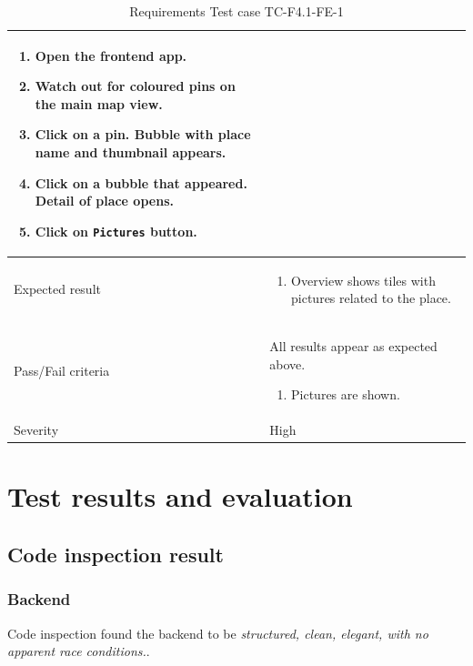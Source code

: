 \documentclass[11pt]{book}
\begin{document}
\begin{table}
\begin{tabular}{| p{3cm} | p{9.5cm} |}
                            \begin{enumerate}
                              \item Open the frontend app.
                              \item Watch out for coloured pins on the main map view.
                              \item Click on a pin. Bubble with place name and thumbnail appears.
                              \item Click on a bubble that appeared. Detail of place opens.
                              \item Click on \texttt{Pictures} button.
                            \end{enumerate} \\ \hline 
    Expected result       & \begin{enumerate}
                              \item Overview shows tiles with pictures related to the place.
                            \end{enumerate} \\ \hline 
    Pass/Fail criteria    & All results appear as expected above.
                            \begin{enumerate}
                              \item Pictures are shown.
                            \end{enumerate} \\ \hline 
    Severity              & High \\ \hline 
  \end{tabular}
  \caption{Requirements Test case TC-F4.1-FE-1}
  \label{tab:TCF4.1FE1}
\end{table}

\section{Test results and evaluation}

\subsection{Code inspection result}

\subsubsection{Backend}

Code inspection found the backend to be \emph{structured, clean, elegant, with no apparent race conditions.}.
\end{document}
